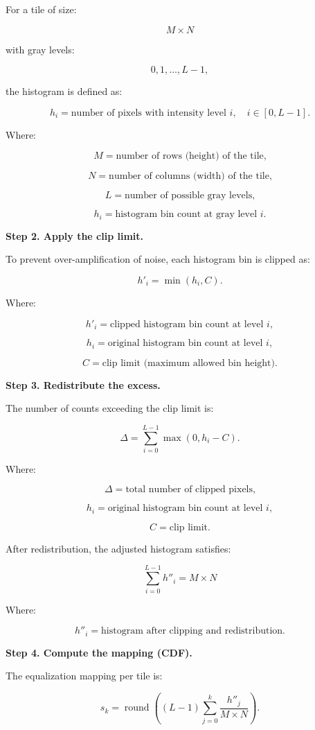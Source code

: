 \documentclass[11pt]{article}
\begin{document}
For a tile of size:

\[
M \times N
\]

with gray levels:

\[
0,1,\dots,L-1,
\]

the histogram is defined as:

\[
h_i = \text{number of pixels with intensity level } i, \quad i \in [0,L-1].
\]

Where:

\[
M = \text{number of rows (height) of the tile,}
\]

\[
N = \text{number of columns (width) of the tile,}
\]

\[
L = \text{number of possible gray levels,}
\]

\[
h_i = \text{histogram bin count at gray level } i.
\]

\textbf{Step 2. Apply the clip limit.}

To prevent over-amplification of noise, each histogram bin is clipped
as:

\[
h'_i = \min(h_i, C).
\]

Where:

\[
h'_i = \text{clipped histogram bin count at level } i,
\]

\[
h_i = \text{original histogram bin count at level } i,
\]

\[
C = \text{clip limit (maximum allowed bin height).}
\]

\textbf{Step 3. Redistribute the excess.}

The number of counts exceeding the clip limit is:

\[
\Delta = \sum_{i=0}^{L-1} \max(0, h_i - C).
\]

Where:

\[
\Delta = \text{total number of clipped pixels,}
\]

\[
h_i = \text{original histogram bin count at level } i,
\]

\[
C = \text{clip limit.}
\]

After redistribution, the adjusted histogram satisfies:

\[
\sum_{i=0}^{L-1} h''_i = M \times N
\]

Where:

\[
h''_i = \text{histogram after clipping and redistribution.}
\]

\textbf{Step 4. Compute the mapping (CDF).}

The equalization mapping per tile is:

\[
s_k = \operatorname{round}\!\left( (L-1) \sum_{j=0}^{k} \frac{h''_j}{M \times N} \right).
\]
\end{document}
